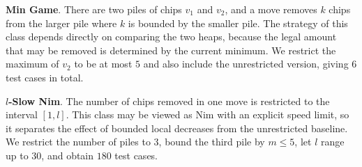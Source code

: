 \documentclass[review]{elsarticle}
\newcommand{\set}[1]{\{ #1 \}}
\newcommand{\tuple}[1]{\langle {#1} \rangle}
\newcommand{\true}{\top}
\newcommand{\statevar}{\mathcal{X}}
\newcommand{\act}{\mathcal{A}}
\newcommand{\constraint}{\mathcal{C}}
\newcommand{\estate}{\mathcal{E}}
\newcommand{\pre}{\mathtt{pre}}
\newcommand{\eff}{\mathtt{eff}}
\begin{document}
{\color{red}\textbf{Min Game}. There are two piles of chips $v_1$ and $v_2$, and a move removes $k$ chips from the larger pile where $k$ is bounded by the smaller pile.}
{\color{red}The strategy of this class depends directly on comparing the two heaps, because the legal amount that may be removed is determined by the current minimum.}
{\color{red}We restrict the maximum of $v_2$ to be at most $5$ and also include the unrestricted version, giving $6$ test cases in total.}

{\color{red}\textbf{$l$-Slow Nim}. The number of chips removed in one move is restricted to the interval $[1,l]$.}
{\color{red}This class may be viewed as Nim with an explicit speed limit, so it separates the effect of bounded local decreases from the unrestricted baseline.}
{\color{red}We restrict the number of piles to $3$, bound the third pile by $m \le 5$, let $l$ range up to $30$, and obtain $180$ test cases.}
\end{document}
